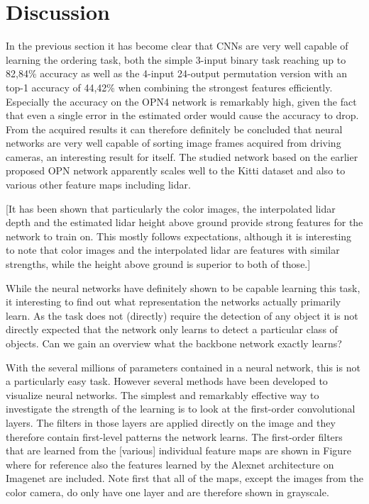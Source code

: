 %
\newpage
\chapter{Discussion}
\label{ch:discussion}
In the previous section it has become clear that CNNs are very well capable of learning the ordering task, both the simple 3-input binary task reaching up to 82,84\% accuracy as well as the 4-input 24-output permutation version with an top-1 accuracy of 44,42\% when combining the strongest features efficiently. Especially the accuracy on the OPN4 network is remarkably high, given the fact that even a single error in the estimated order would cause the accuracy to drop. From the acquired results it can therefore definitely be concluded that neural networks are very well capable of sorting image frames acquired from driving cameras, an interesting result for itself. The studied network based on the earlier proposed OPN network \cite{lee2017} apparently scales well to the Kitti dataset and also to various other feature maps including lidar.

[It has been shown that particularly the color images, the interpolated lidar depth and the estimated lidar height above ground provide strong features for the network to train on. This mostly follows expectations, although it is interesting to note that color images and the interpolated lidar are features with similar strengths, while the height above ground is superior to both of those.]

While the neural networks have definitely shown to be capable learning this task, it interesting to find out what representation the networks actually primarily learn. As the task does not (directly) require the detection of any object it is not directly expected that the network only learns to detect a particular class of objects. Can we gain an overview what the backbone network exactly learns? 

With the several millions of parameters contained in a neural network, this is not a particularly easy task. However several methods have been developed to visualize neural networks. The simplest and remarkably effective way to investigate the strength of the learning is to look at the first-order convolutional layers. The filters in those layers are applied directly on the image and they therefore contain first-level patterns the network learns. The first-order filters that are learned from the [various] individual feature maps are shown in Figure \needfig where for reference also the features learned by the Alexnet architecture\cite{krizhevsky2012} on Imagenet are included. Note first that all of the maps, except the images from the color camera, do only have one layer and are therefore shown in grayscale. 

